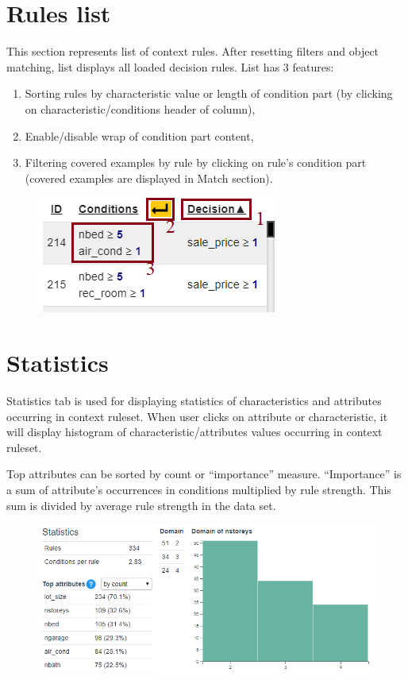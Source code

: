\documentclass[12pt]{article}
\begin{document}
\section{Rules list}

This section represents list of context rules. After resetting filters and object matching, list displays all loaded decision rules. List has 3 features:
\begin{enumerate}
    \setlength\itemsep{0em}
    \item Sorting rules by characteristic value or length of condition part (by clicking on characteristic/conditions header of column),
    \item Enable/disable wrap of condition part content,
    \item Filtering covered examples by rule by clicking on rule's condition part (covered examples are displayed in Match section).
\end{enumerate}

\begin{figure}[H]
    \centering
    \includegraphics{figures/B-list.png}
\end{figure}

\section{Statistics}

Statistics tab is used for displaying statistics of characteristics and attributes occurring in context ruleset. When user clicks on attribute or characteristic, it will display histogram of characteristic/attributes values occurring in context ruleset.

Top attributes can be sorted by count or ``importance'' measure. ``Importance'' is a sum of attribute's occurrences in conditions multiplied by rule strength. This sum is divided by average rule strength in the data set.

\begin{figure}[H]
    \centering
    \includegraphics[width=\textwidth]{figures/B-statistics.png}
\end{figure}
\end{document}
